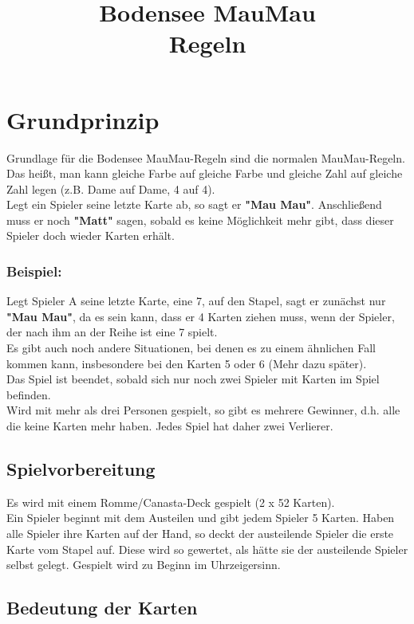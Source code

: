 \documentclass{article}
\title{Bodensee MauMau \\ Regeln}
\begin{document}
\section*{Grundprinzip}
Grundlage für die Bodensee MauMau-Regeln sind die normalen MauMau-Regeln. Das heißt, man kann gleiche Farbe auf gleiche Farbe und gleiche Zahl auf gleiche Zahl legen (z.B. Dame auf
Dame, 4 auf 4). \\
Legt ein Spieler seine letzte Karte ab, so sagt er \textbf{"Mau Mau"}. Anschließend muss er noch  \textbf{"Matt"} sagen, sobald es keine Möglichkeit mehr gibt, dass dieser Spieler doch wieder Karten erhält.
\subsubsection*{Beispiel:}
Legt Spieler A seine letzte Karte, eine 7, auf den Stapel, sagt er zunächst nur \textbf{"Mau Mau"}, da es sein kann, dass er 4 Karten ziehen muss, wenn der Spieler, der nach ihm an der Reihe ist eine 7 spielt. \\
Es gibt auch noch andere Situationen, bei denen es zu einem ähnlichen Fall kommen kann, insbesondere bei den Karten 5 oder 6 (Mehr dazu später).  \\
Das Spiel ist beendet, sobald sich nur noch zwei Spieler mit Karten im Spiel befinden. \\ Wird mit mehr als drei Personen gespielt, so gibt es mehrere Gewinner, d.h. alle die keine Karten mehr haben. Jedes Spiel hat daher zwei Verlierer.
\subsection*{Spielvorbereitung}
Es wird mit einem Romme/Canasta-Deck gespielt (2 x 52 Karten). \\ Ein Spieler beginnt mit dem Austeilen und gibt jedem Spieler 5 Karten. Haben alle Spieler ihre Karten auf der Hand, so deckt der austeilende Spieler die erste Karte vom Stapel auf. Diese wird so gewertet, als hätte sie der austeilende Spieler selbst gelegt. Gespielt wird zu Beginn im Uhrzeigersinn. \\
\subsection*{Bedeutung der Karten}       
        
\end{document}
